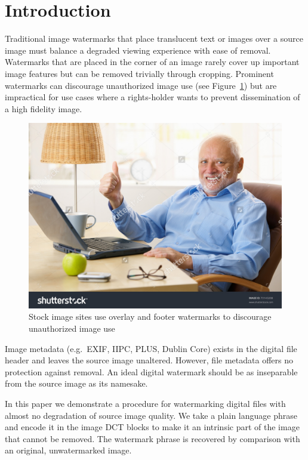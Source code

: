 \section{Introduction}\label{sec:intro}
Traditional image watermarks that place translucent text or images over a source image must balance a degraded viewing experience with ease of removal.
Watermarks that are placed in the corner of an image rarely cover up important image features but can be removed trivially through cropping.
Prominent watermarks can discourage unauthorized image use (see Figure~\ref{fig:thumbs-up-wm}) but are impractical for use cases where a rights-holder wants to prevent dissemination of a high fidelity image.

\begin{figure}[tbph]
  \centering
  \includegraphics[width=0.7\linewidth]{graphics/thumbs-up-wm}
  \caption{Stock image sites use overlay and footer watermarks to discourage unauthorized image use~\cite{stocklite:old-man}}
  \label{fig:thumbs-up-wm}
\end{figure}

Image metadata (e.g.\ EXIF, IIPC, PLUS, Dublin Core) exists in the digital file header and leaves the source image unaltered.
However, file metadata offers no protection against removal.\citeneeded{} An ideal digital watermark should be as inseparable from the source image as its namesake.

In this paper we demonstrate a procedure for watermarking digital files with almost no degradation of source image quality.
We take a plain language phrase and encode it in the image DCT blocks to make it an intrinsic part of the image that cannot be removed.
The watermark phrase is recovered by comparison with an original, unwatermarked image.
